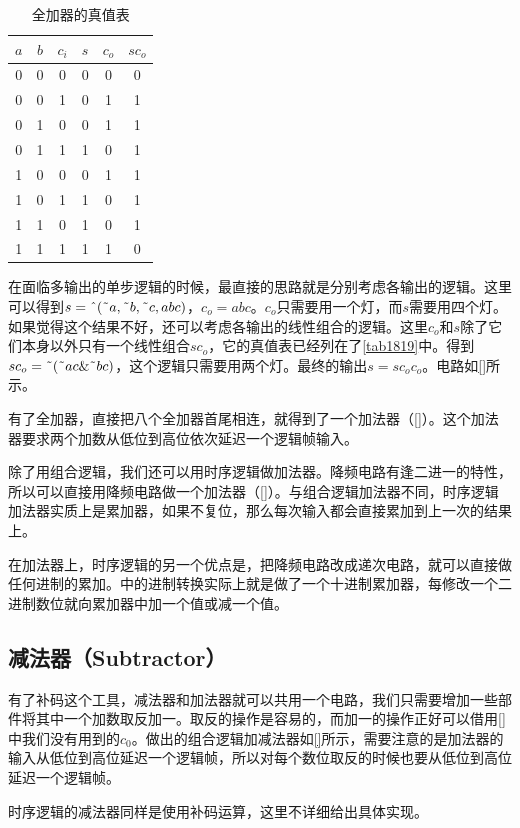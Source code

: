 \begin{table}[!h]
\centering
\begin{tabular}{ccc|ccc}
$a$&$b$&$c_i$&$s$&$c_o$&$sc_o$\\\hline
0&0&0&0&0&0\\
0&0&1&0&1&1\\
0&1&0&0&1&1\\
0&1&1&1&0&1\\
1&0&0&0&1&1\\
1&0&1&1&0&1\\
1&1&0&1&0&1\\
1&1&1&1&1&0
\end{tabular}
\caption{全加器的真值表}\label{tab1819}
\end{table}

在面临多输出的单步逻辑的时候，最直接的思路就是分别考虑各输出的逻辑。这里可以得到$s=\textrm{\^{}}(\textrm{\~{}}a,\textrm{\~{}}b,\textrm{\~{}}c,abc)$，$c_o=abc$。$c_o$只需要用一个灯，而$s$需要用四个灯。如果觉得这个结果不好，还可以考虑各输出的线性组合的逻辑。这里$c_o$和$s$除了它们本身以外只有一个线性组合$sc_o$，它的真值表已经列在了\autoref{tab1819}中。得到$sc_o=\textrm{\~{}}(\textrm{\~{}}ac\&\textrm{\~{}}bc)$，这个逻辑只需要用两个灯。最终的输出$s=sc_oc_o$。电路如\autoref{}所示。

有了全加器，直接把八个全加器首尾相连，就得到了一个加法器（\autoref{}）。这个加法器要求两个加数从低位到高位依次延迟一个逻辑帧输入。

除了用组合逻辑，我们还可以用时序逻辑做加法器。降频电路有逢二进一的特性，所以可以直接用降频电路做一个加法器（\autoref{}）。与组合逻辑加法器不同，时序逻辑加法器实质上是累加器，如果不复位，那么每次输入都会直接累加到上一次的结果上。

在加法器上，时序逻辑的另一个优点是，把降频电路改成递次电路，就可以直接做任何进制的累加。\url{}中的进制转换实际上就是做了一个十进制累加器，每修改一个二进制数位就向累加器中加一个值或减一个值。

\subsection{减法器（Subtractor）}
有了补码这个工具，减法器和加法器就可以共用一个电路，我们只需要增加一些部件将其中一个加数取反加一。取反的操作是容易的，而加一的操作正好可以借用\autoref{}中我们没有用到的$c_0$。做出的组合逻辑加减法器如\autoref{}所示，需要注意的是加法器的输入从低位到高位延迟一个逻辑帧，所以对每个数位取反的时候也要从低位到高位延迟一个逻辑帧。

时序逻辑的减法器同样是使用补码运算，这里不详细给出具体实现。

